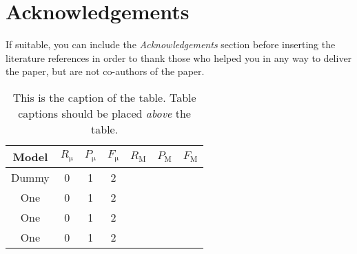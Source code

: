 \documentclass[10pt, a4paper]{article}
\begin{document}
\section*{Acknowledgements}



If suitable, you can include the \textit{Acknowledgements} section before inserting the literature references  in order to thank those who helped you in any way to deliver the paper, but are not co-authors of the paper.

\begin{table}
	\caption{This is the caption of the table. Table captions should be placed \textit{above} the table.}
	\label{tab:narrow-table}
	\begin{center}
		\begin{tabular}{c|ccc|ccc}
			\toprule
			Model & $R_\mathrm{\mu}$ & $P_\mathrm{\mu}$ & $F_\mathrm{\mu}$ & $R_\mathrm{M}$ & $P_\mathrm{M}$ & $F_\mathrm{M}$\\
			\midrule
			Dummy & 0 & 1 & 2 \\
			One & 0 & 1 & 2 \\
			One & 0 & 1 & 2 \\
			\midrule
			One & 0 & 1 & 2 \\
			\bottomrule
		\end{tabular}
	\end{center}
\end{table}



\end{document}
